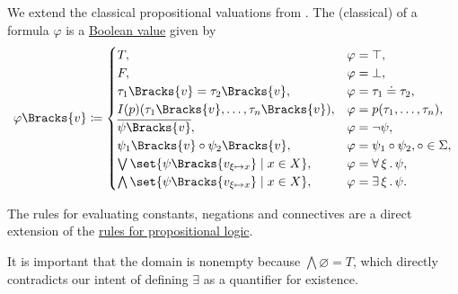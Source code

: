 \begin{definition}
\begin{thmenum}
     We extend the classical propositional valuations from . The (classical)  of a formula \( \varphi \) is a \hyperref[def:boolean_value]{Boolean value} given by
    \begin{equation}\label{eq:def:first_order_valuation/formula_valuation}
      \varphi\Bracks{v} \coloneqq \begin{cases}
        T,                                                              &\varphi = \top, \\
        F,                                                              &\varphi = \bot, \\
        \tau_1\Bracks{v} = \tau_2\Bracks{v},                            &\varphi = \tau_1 \doteq \tau_2, \\
        I(p)(\tau_1\Bracks{v}, \ldots, \tau_n\Bracks{v}),               &\varphi = p(\tau_1, \ldots, \tau_n), \\
        \overline{\psi\Bracks{v}},                                      &\varphi = \neg \psi, \\
        \psi_1\Bracks{v} \bincirc \psi_2\Bracks{v},                     &\varphi = \psi_1 \bincirc \psi_2, \bincirc \in \Sigma, \\
        \bigvee\set{ \psi\Bracks{v_{\xi \mapsto x}} \given x \in X },   &\varphi = \qforall \xi \psi, \\
        \bigwedge\set{ \psi\Bracks{v_{\xi \mapsto x}} \given x \in X }, &\varphi = \qexists \xi \psi.
      \end{cases}
    \end{equation}

    The rules for evaluating constants, negations and connectives are a direct extension of the \hyperref[def:propositional_valuation/formula_valuation]{rules for propositional logic}.

    It is important that the domain is nonempty because \( \bigwedge\varnothing = T \), which directly contradicts our intent of defining \( \exists \) as a quantifier for existence.
  \end{thmenum}
\end{definition}

